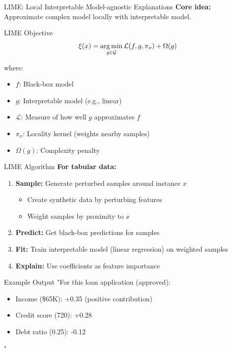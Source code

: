 \documentclass[aspectratio=169]{beamer}
\begin{document}
\begin{frame}{LIME: Local Interpretable Model-agnostic Explanations}
  \textbf{Core idea:} Approximate complex model locally with interpretable model.

  \vspace{0.5em}

  \begin{definitionbox}{LIME Objective}
    \begin{equation}
      \xi(x) = \operatorname*{arg\,min}_{g \in \mathcal{G}} \mathcal{L}(f, g, \pi_x) + \Omega(g)
    \end{equation}

    where:
    \begin{itemize}
      \item $f$: Black-box model
      \item $g$: Interpretable model (e.g., linear)
      \item $\mathcal{L}$: Measure of how well $g$ approximates $f$
      \item $\pi_x$: Locality kernel (weights nearby samples)
      \item $\Omega(g)$: Complexity penalty
    \end{itemize}
  \end{definitionbox}
\end{frame}

\begin{frame}{LIME Algorithm}
  \textbf{For tabular data:}

  \begin{enumerate}
    \item \textbf{Sample:} Generate perturbed samples around instance $x$
    \begin{itemize}
      \item Create synthetic data by perturbing features
      \item Weight samples by proximity to $x$
    \end{itemize}

    \item \textbf{Predict:} Get black-box predictions for samples

    \item \textbf{Fit:} Train interpretable model (linear regression) on weighted samples

    \item \textbf{Explain:} Use coefficients as feature importance
  \end{enumerate}

  \vspace{0.5em}

  \begin{examplebox}{Example Output}
    "For this loan application (approved):
    \begin{itemize}
      \item Income (\$65K): +0.35 (positive contribution)
      \item Credit score (720): +0.28
      \item Debt ratio (0.25): -0.12
    \end{itemize}"
  \end{examplebox}
\end{frame}
\end{document}
